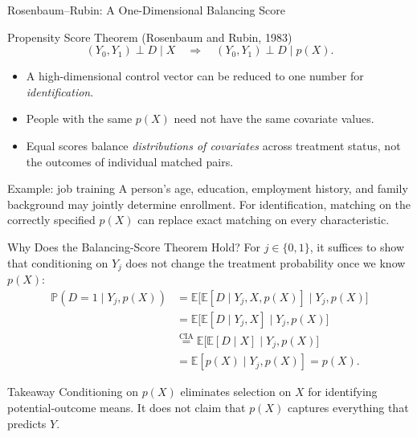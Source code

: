 \documentclass[aspectratio=169,11pt]{beamer}
\newcommand{\E}{\mathbb{E}}
\newcommand{\Pp}{\mathbb{P}}
\begin{document}
\begin{frame}{Rosenbaum--Rubin: A One-Dimensional Balancing Score}
\small
\begin{block}{Propensity Score Theorem (Rosenbaum and Rubin, 1983)}
\[
(Y_0,Y_1)\perp D\mid X
\quad\Longrightarrow\quad
\boxed{(Y_0,Y_1)\perp D\mid p(X).}
\]
\end{block}
\medskip
\begin{itemize}
\item A high-dimensional control vector can be reduced to one number for \emph{identification}.
\item People with the same \(p(X)\) need not have the same covariate values.
\item Equal scores balance \emph{distributions of covariates} across treatment status, not the outcomes of individual matched pairs.
\end{itemize}
\medskip
\begin{block}{Example: job training}
A person's age, education, employment history, and family background may jointly determine enrollment. For identification, matching on the correctly specified \(p(X)\) can replace exact matching on every characteristic.
\end{block}
\end{frame}

\begin{frame}{Why Does the Balancing-Score Theorem Hold?}
\small
For \(j\in\{0,1\}\), it suffices to show that conditioning on \(Y_j\) does not change the treatment probability once we know \(p(X)\):
\begin{align*}
\Pp(D=1\mid Y_j,p(X))
&=\E\big[\E[D\mid Y_j,X,p(X)]\mid Y_j,p(X)\big]\\
&=\E\big[\E[D\mid Y_j,X]\mid Y_j,p(X)\big]\\
&\stackrel{\mathrm{CIA}}{=}\E\big[\E[D\mid X]\mid Y_j,p(X)\big]\\
&=\E[p(X)\mid Y_j,p(X)]=p(X).
\end{align*}
\begin{block}{Takeaway}
Conditioning on \(p(X)\) eliminates selection on \(X\) for identifying potential-outcome means. It does \alert{not} claim that \(p(X)\) captures everything that predicts \(Y\).
\end{block}
\end{frame}
\end{document}
